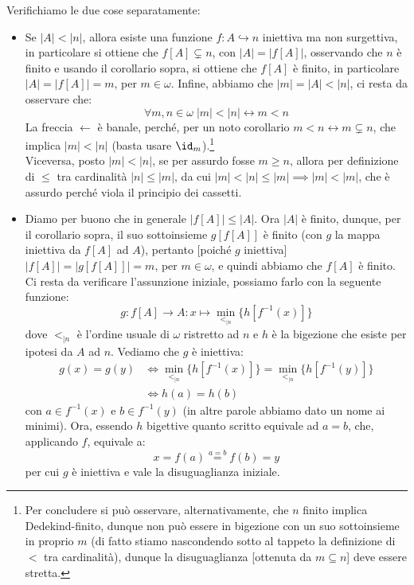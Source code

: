 \documentclass[11pt]{scrartcl}
\begin{document}
\begin{soln}
	Verifichiamo le due cose separatamente:
	\begin{itemize}
		\item Se $|A|<|n|$, allora esiste una funzione $f : A \hookrightarrow n$ iniettiva ma non surgettiva, in particolare si ottiene che $f[A]\subsetneq n$,
		con $|A| = |f[A]|$, osservando che $n$ è finito e usando il corollario sopra, si ottiene che $f[A]$ è finito, in particolare $|A| = |f[A]| = m$, per $m \in \omega$.
		Infine, abbiamo che $|m| = |A| < |n|$, ci resta da osservare che:
		\[ \forall m,n \in \omega \; |m|<|n|\longleftrightarrow m <n
			\]
		La freccia $\leftarrow$ è banale, perché, per un noto corollario $m < n \leftrightarrow m \subsetneq n$, che implica $|m| < |n|$ (basta usare $\id_m$).\footnote{Per concludere si può osservare,
		alternativamente, che $n$ finito implica Dedekind-finito, dunque non può essere in bigezione con un suo sottoinsieme in proprio $m$ (di fatto stiamo nascondendo sotto al tappeto la definizione di $<$ tra cardinalità),
		dunque la disuguaglianza [ottenuta da $m \subseteq n$] deve essere stretta.}\\
		Viceversa, posto $|m|<|n|$, se per assurdo fosse $m \geq n$, allora per definizione di $\leq$ tra cardinalità $|n| \leq |m|$, da cui $|m|<|n|\leq |m| \implies |m| < |m|$, che è assurdo perché viola il principio dei cassetti.
		\item Diamo per buono che in generale $|f[A]| \leq |A|$. Ora $|A|$ è finito, dunque, per il corollario sopra, il suo sottoinsieme $g[f[A]]$ è finito (con $g$ la mappa iniettiva da $f[A]$ ad $A$), pertanto [poiché $g$ iniettiva]
		$|f[A]| = |g[f[A]]| = m$, per $m \in \omega$, e quindi abbiamo che $f[A]$ è finito.\\
		Ci resta da verificare l'assunzione iniziale, possiamo farlo con la seguente funzione:
		\[ g : f[A] \longrightarrow A : x \longmapsto \min_{<_{|n}}\{h[f^{-1}(x)]\}
			\]
		dove $<_{|n}$ è l'ordine usuale di $\omega$ ristretto ad $n$ e $h$ è la bigezione che esiste per ipotesi da $A$ ad $n$.
		Vediamo che $g$ è iniettiva:
		\[	\begin{split}
			g(x) = g(y) &\iff \min_{<_{|n}}\{h[f^{-1}(x)]\} = \min_{<_{|n}}\{h[f^{-1}(y)]\} \\
						&\iff h(a) = h(b)
		\end{split}
			\]
		con $a \in f^{-1}(x)$ e $b \in f^{-1}(y)$ (in altre parole abbiamo dato un nome ai minimi). Ora, essendo $h$ bigettive quanto scritto equivale ad $a  = b$, che, applicando $f$,
		equivale a:
		\[ x = f(a) \overset{a = b}{=} f(b) = y
			\]
		per cui $g$ è iniettiva e vale la disuguaglianza iniziale.
	\end{itemize}
\end{soln}
\end{document}
